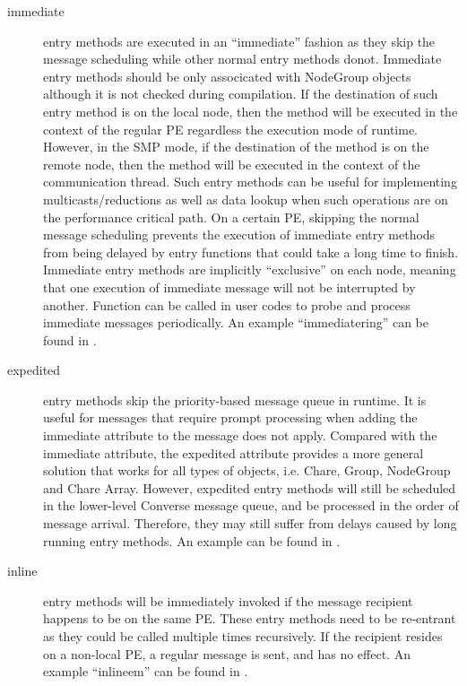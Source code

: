 \begin{description}
\item[immediate] entry methods are executed in an
``immediate'' fashion as they skip the message scheduling while other normal
entry methods donot. Immediate entry methods should be only associcated with
NodeGroup objects although it is not checked during compilation. If the
destination of such entry method is on the local node, then the method will be
executed in the context of the regular PE regardless the execution mode of
\charmpp{} runtime. However, in the SMP mode, if the destination of the method
is on the remote node, then the method will be executed in the context of the
communication thread.  
Such entry methods can be useful for implementing multicasts/reductions as well
as data lookup when such operations are on the performance critical path. On a
certain \charmpp{} PE, skipping the normal message scheduling prevents the
execution of immediate entry methods from being delayed by entry functions that
could take a long time to finish. Immediate entry methods are implicitly
``exclusive'' on each node, meaning that one execution of immediate message
will not be interrupted by another. Function  can be
called in user codes to probe and process immediate messages periodically. An
example ``immediatering'' can be found in .

\item[expedited] entry methods skip the priority-based message
queue in \charmpp{} runtime. It is useful for messages that require prompt
processing when adding the immediate attribute to the message does not apply.
Compared with the immediate attribute, the expedited attribute provides a more
general solution that works for all types of \charmpp{} objects, i.e. Chare,
Group, NodeGroup and Chare Array. However, expedited entry methods will still
be scheduled in the lower-level Converse message queue, and be processed in the
order of message arrival. Therefore, they may still suffer from delays caused
by long running entry methods. An example can be found in 
.

\item[inline] entry methods will be immediately invoked if the
message recipient happens to be on the same PE. These entry methods need to be
re-entrant as they could be called multiple times recursively. If the recipient
resides on a non-local PE, a regular message is sent, and  has no
effect. An example ``inlineem'' can be found in .


\end{description}
